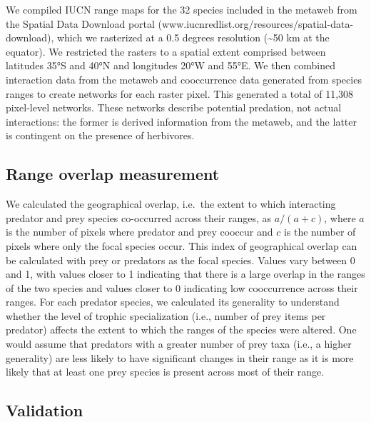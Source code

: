 \documentclass[10pt,oneside]{article}
\begin{document}
We compiled IUCN range maps for the 32 species included in the metaweb
from the Spatial Data Download portal
(www.iucnredlist.org/resources/spatial-data-download), which we
rasterized at a 0.5 degrees resolution (\textasciitilde50 km at the
equator). We restricted the rasters to a spatial extent comprised
between latitudes 35°S and 40°N and longitudes 20°W and 55°E. We then
combined interaction data from the metaweb and cooccurrence data
generated from species ranges to create networks for each raster pixel.
This generated a total of 11,308 pixel-level networks. These networks
describe potential predation, not actual interactions: the former is
derived information from the metaweb, and the latter is contingent on
the presence of herbivores.

\hypertarget{range-overlap-measurement}{%
\subsection{Range overlap measurement}\label{range-overlap-measurement}}

We calculated the geographical overlap, i.e.~the extent to which
interacting predator and prey species co-occurred across their ranges,
as \(a/(a + c)\), where \(a\) is the number of pixels where predator and
prey cooccur and \(c\) is the number of pixels where only the focal
species occur. This index of geographical overlap can be calculated with
prey or predators as the focal species. Values vary between 0 and 1,
with values closer to 1 indicating that there is a large overlap in the
ranges of the two species and values closer to 0 indicating low
cooccurrence across their ranges. For each predator species, we
calculated its generality to understand whether the level of trophic
specialization (i.e., number of prey items per predator) affects the
extent to which the ranges of the species were altered. One would assume
that predators with a greater number of prey taxa (i.e., a higher
generality) are less likely to have significant changes in their range
as it is more likely that at least one prey species is present across
most of their range.

\hypertarget{validation}{%
\subsection{Validation}\label{validation}}
\end{document}
